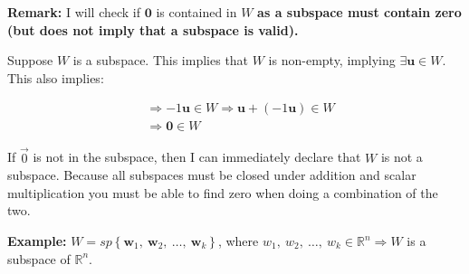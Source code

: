 \documentclass[12pt]{article}
\theoremstyle{plain}
\theoremstyle{remark}
\theoremstyle{definition}
\begin{document}
\textbf{Remark:} I will check if \(\mathbf{0}\) is contained in
\(W\) \textbf{as a subspace must contain zero (but does not imply that a
subspace is valid).}

Suppose \(W\) is a subspace. This implies that \(W\) is non-empty,
implying \(\exists\mathbf{u} \in W\). This also implies:

\begin{align*}
&\Rightarrow - 1\mathbf{u} \in W \Rightarrow \mathbf{u} + \left( - 1\mathbf{u} \right) \in W \\
&\Rightarrow \mathbf{0} \in W
\end{align*}


If \(\overrightarrow{0}\) is not in the subspace, then I can immediately
declare that \(W\) is not a subspace. Because all subspaces must be
closed under addition and scalar multiplication you must be able to find
zero when doing a combination of the two.

\textbf{Example:}
\(W = sp\left\{ {\mathbf{w}}_{1},\ {\mathbf{w}}_{2},\ \ldots,\ {\mathbf{w}}_{k} \right\}\),
where
\(w_{1},\ w_{2},\ \ldots,\ w_{k} \in \mathbb{R}^{n} \Rightarrow W\) is a
subspace of \(\mathbb{R}^{n}\).
\end{document}

